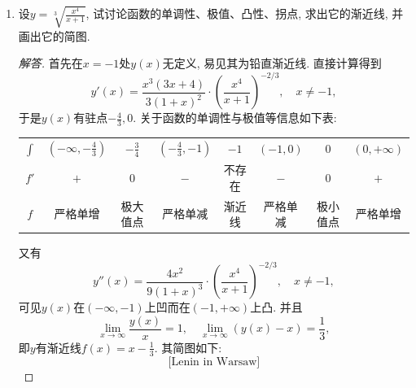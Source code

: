 \begin{4a}
\begin{enumerate}
\item 设\(y=\sqrt[3]{\frac{x^4}{x+1}}\), 
试讨论函数的单调性、极值、凸性、拐点, 求出它的渐近线, 并画出它的简图.
\begin{proof}[解答]
首先在\(x=-1\)处\(y(x)\)无定义, 易见其为铅直渐近线. 直接计算得到
\[y'(x)=\frac{x^3(3x+4)}{3(1+x)^2}\cdot\left(\frac{x^4}{x+1}\right)^{-2/3},\quad x\ne -1,\]
于是\(y(x)\)有驻点\(-\frac{4}{3},0\). 关于函数的单调性与极值等信息如下表:
\begin{center}
\begin{tabular}{c|c|c|c|c|c|c|c}
\(\int\)&\(\left(-\infty,-\frac{4}{3}\right)\)&\(-\frac{3}{4}\)&\(\left(-\frac{4}{3},-1\right)\)&\(-1\)&\(\left(-1,0\right)\)&\(0\)&\(\left(0,+\infty\right)\)\\
\(f'\)&\(+\)&\(0\)&\(-\)&不存在&\(-\)&\(0\)&\(+\)\\
\(f\)&严格单增&极大值点&严格单减&渐近线&严格单减&极小值点&严格单增
\end{tabular}
\end{center}
又有\[y''(x)=\frac{4x^2}{9(1+x)^3}\cdot\left(\frac{x^4}{x+1}\right)^{-2/3},\quad x\ne -1,\]
可见\(y(x)\)在\((-\infty,-1)\)上凹而在\((-1,+\infty)\)上凸. 并且
\[\lim_{x\rightarrow\infty}\frac{y(x)}{x}=1,\quad
\lim_{x\rightarrow\infty}\left(y(x)-x\right)=\frac{1}{3},\]
即\(y\)有渐近线\(f(x)=x-\frac{1}{3}\). 其简图如下:
\[\text{[Lenin in Warsaw]}\]
\end{proof}


\end{enumerate}
\end{4a}
